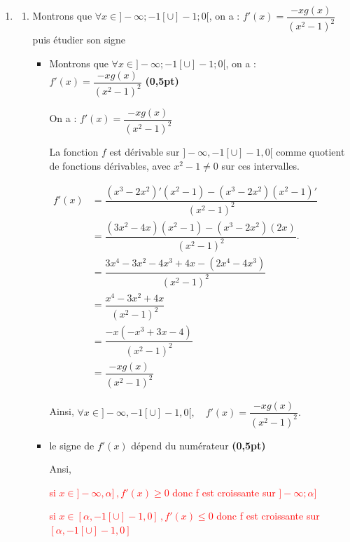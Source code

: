 \documentclass[12pt,a4paper]{article}
\begin{document}
\begin{enumerate}
    \item 
    \begin{enumerate}
        \item Montrons que $\forall x \in ]-\infty; -1[ \cup ]-1; 0[$, on a : 
        $f'(x) = \dfrac{-xg(x)}{(x^2-1)^2}$ puis étudier son signe
\begin{itemize}
\item Montrons que $\forall x \in ]-\infty; -1[ \cup ]-1; 0[$, on a : 
        $f'(x) = \dfrac{-xg(x)}{(x^2-1)^2}$ \textbf{(0,5pt)}
        
On a : $ f'(x)=\dfrac{-xg(x)}{(x^2-1)^2} $

La fonction $f$ est dérivable sur $]-\infty,-1[ \cup ]-1,0[$ comme quotient de fonctions dérivables,
avec $x^2-1\neq 0$ sur ces intervalles.

\(
 \begin{aligned} 
 f'(x) &= \dfrac{(x^3-2x^2)'(x^2-1)-(x^3-2x^2)(x^2-1)'}{(x^2-1)^2}\\
       &= \dfrac{(3x^2-4x)(x^2-1)-(x^3-2x^2)(2x)}{(x^2-1)^2}.\\
       &= \dfrac{3x^4-3x^2-4x^3+4x-(2x^4-4x^3)}{(x^2-1)^2}\\
       &= \dfrac{x^4-3x^2+4x}{(x^2-1)^2}\\
       &= \dfrac{-x(-x^3+3x-4)}{(x^2-1)^2}\\
       &=\dfrac{-xg(x)}{(x^2-1)^2}
 \end{aligned}    
 \)  

Ainsi,
\(
\forall x \in ]-\infty,-1[ \cup ]-1,0[, \quad
f'(x)=\dfrac{-xg(x)}{(x^2-1)^2}.
\)   

\item le signe de $f'(x)$ dépend du numérateur \textbf{(0,5pt)}    


Ansi, 
 
\textcolor{red}{ si \(x\in ]-\infty,\alpha]\,, f'(x) \geq 0 \)  donc f est croissante sur $]-\infty; \alpha]$}  

\textcolor{red}{ si \(x\in [\alpha,-1[ \cup]-1,0] \,, f'(x) \leq 0 \)  donc f est croissante sur $[\alpha,-1[ \cup]-1,0]$}  


\end{itemize}
\end{enumerate}
\end{enumerate}
\end{document}
